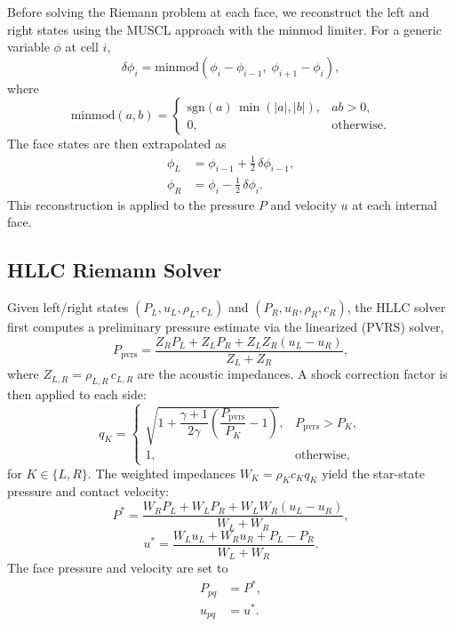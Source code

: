 \documentclass[twocolumn]{aastex63}
\newcommand{\vel}{{u}}
\begin{document}
Before solving the Riemann problem at each face, we reconstruct the
left and right states using the MUSCL approach with the minmod limiter.
For a generic variable $\phi$ at cell $i$,
\begin{equation}
  \delta\phi_i = \mathrm{minmod}(\phi_i - \phi_{i-1},\;\phi_{i+1} - \phi_i),
\end{equation}
where
\begin{equation}
  \mathrm{minmod}(a,b) =
  \begin{cases}
    \mathrm{sgn}(a)\,\min(|a|,|b|), & ab > 0, \\
    0, & \text{otherwise}.
  \end{cases}
\end{equation}
The face states are then extrapolated as
\begin{equation}
  \begin{aligned}
  \phi_L &= \phi_{i-1} + \tfrac{1}{2}\,\delta\phi_{i-1},\\
  \phi_R &= \phi_{i}   - \tfrac{1}{2}\,\delta\phi_{i}.
  \end{aligned}
\end{equation}
This reconstruction is applied to the pressure $P$ and velocity $\vel$
at each internal face.


\subsection{HLLC Riemann Solver}

Given left/right states $(P_L, \vel_L, \rho_L, c_L)$ and
$(P_R, \vel_R, \rho_R, c_R)$, the HLLC solver
\citep[e.g.,][]{toro2009} first computes
a preliminary pressure estimate via the linearized (PVRS) solver,
\begin{equation}
  P_\text{pvrs}
  = \frac{Z_R P_L + Z_L P_R + Z_L Z_R (\vel_L - \vel_R)}{Z_L + Z_R},
\end{equation}
where $Z_{L,R} = \rho_{L,R}\,c_{L,R}$ are the acoustic impedances.
A shock correction factor is then applied to each side:
\begin{equation}
  q_K = \begin{cases}
    \sqrt{1 + \dfrac{\gamma+1}{2\gamma}\left(\dfrac{P_\text{pvrs}}{P_K}-1\right)}, & P_\text{pvrs} > P_K, \\[6pt]
    1, & \text{otherwise},
  \end{cases}
\end{equation}
for $K \in \{L,R\}$.
The weighted impedances $W_K = \rho_K c_K q_K$ yield the star-state
pressure and contact velocity:
\begin{equation}
  P^* = \frac{W_R P_L + W_L P_R + W_L W_R(\vel_L - \vel_R)}{W_L + W_R},
\end{equation}
\begin{equation}
  \vel^* = \frac{W_L \vel_L + W_R \vel_R + P_L - P_R}{W_L + W_R}.
\end{equation}
The face pressure and velocity are set to
\begin{equation*}
\begin{aligned}
  P_{pq} &= P^*,\\
  \vel_{pq} &= \vel^*.
\end{aligned}
\end{equation*}
\end{document}
